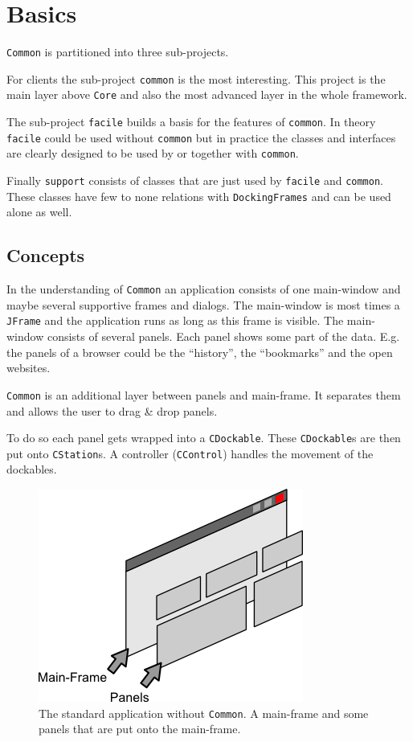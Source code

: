 \documentclass[a4paper,10pt]{article}
\newcommand{\src}[1]{\texttt{#1}}
\begin{document}
\section{Basics}
\src{Common} is partitioned into three sub-projects.

For clients the sub-project \src{common} is the most interesting. This project is the main layer above \src{Core} and also the most advanced layer in the whole framework.

The sub-project \src{facile} builds a basis for the features of \src{common}. In theory \src{facile} could be used without \src{common} but in practice the classes and interfaces are clearly designed to be used by or together with \src{common}.

Finally \src{support} consists of classes that are just used by \src{facile} and \src{common}. These classes have few to none relations with \src{DockingFrames} and can be used alone as well.

\subsection{Concepts}
In the understanding of \src{Common} an application consists of one main-window and maybe several supportive frames and dialogs. The main-window is most times a \src{JFrame} and the application runs as long as this frame is visible. The main-window consists of several panels. Each panel shows some part of the data. E.g. the panels of a browser could be the ``history'', the ``bookmarks'' and the open websites.

\src{Common} is an additional layer between panels and main-frame. It separates them and allows the user to drag \& drop panels.

To do so each panel gets wrapped into a \src{CDockable}. These \src{CDockable}s are then put onto \src{CStation}s. A controller (\src{CControl}) handles the movement of the dockables.

\begin{figure}[ht]
\centering
\includegraphics[scale=1]{app_without}
\caption{The standard application without \src{Common}. A main-frame and some panels that are put onto the main-frame.}
\label{fig:app_without}
\end{figure}
\end{document}

